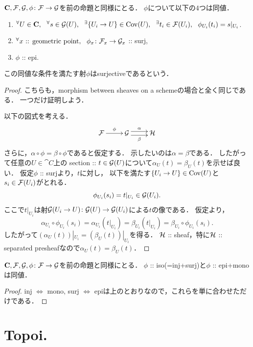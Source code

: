 \documentclass[a4paper, dvipdfmx]{jsarticle}
\begin{document}
\begin{Prop}\label{prop:surj}
    $\mathbf{C}, \mathcal{F}, \mathcal{G}, \phi \colon \mathcal{F} \to \mathcal{G}$を前の命題と同様にとる．
    $\phi$について以下の$4$つは同値．
    \begin{enumerate}
        \item ${}^{\forall} U \in \mathbf{C},~~ {}^{\forall} s \in \mathcal{G}(U),~~ {}^{\exists} \{U_i \to U\} \in \operatorname{Cov}(U),~~
                {}^{\exists} t_i \in \mathcal{F}(U_i),~~ \phi_{U_i}(t_i)=s|_{U_i}$.
        \item ${}^{\forall} x \text{ :: geometric point},~~ \phi_{x} \colon \mathcal{F}_x \to \mathcal{G}_x$ :: surj,
        \item $\phi$ :: epi.
    \end{enumerate}
    この同値な条件を満たす射$\phi$はsurjectiveであるという．
\end{Prop}
\begin{proof}
    こちらも，morphism between sheaves on a schemeの場合と全く同じである．
    一つだけ証明しよう．

    以下の図式を考える．
    \[\xymatrix{
        \shF \ar[r]^-{\phi}& \shG \ar@<1mm>[r]^-{\alpha} \ar@<-1mm>[r]_-{\beta}& \shH
    }\]
    さらに，$\alpha \circ \phi=\beta \circ \phi$であると仮定する．
    示したいのは$\alpha=\beta$である．
    したがって任意の$U \in \cat{C}$上の
    section :: $t \in \mathcal{G}(U)$について$\alpha_U(t)=\beta_U(t)$を示せば良い．
    仮定$\phi$ :: surjより，$t$に対し，
    以下を満たす$\{U_i \to U\} \in \operatorname{Cov}(U)$と$s_i \in \mathcal{F}(U_i)$がとれる．
    \[ \phi_{U_i}(s_i)=t|_{U_i} \in \mathcal{G}(U_i). \]
    ここで$t|_{U_i}$は射$\mathcal{G}(U_i \to U) \colon \mathcal{G}(U) \to \mathcal{G}(U_i)$による$t$の像である．
    仮定より，
    \[
        \alpha_{U_i} \circ \phi_{U_i}(s_i)
        =\alpha_{U_i}(t|_{U_i})=\beta_{U_i}(t|_{U_i})
        =\beta_{U_i} \circ \phi_{U_i}(s_i).
    \]
    したがって$(\alpha_U(t))|_{U_i}=(\beta_U(t))|_{U_i}$を得る．
    $\mathcal{H}$ :: sheaf，特に$\mathcal{H}$ :: separated presheafなので$\alpha_U(t)=\beta_U(t)$．
\end{proof}

\begin{Prop}
    $\mathbf{C}, \mathcal{F}, \mathcal{G}, \phi \colon \mathcal{F} \to \mathcal{G}$を前の命題と同様にとる．
    $\phi$ :: iso(=inj+surj)と$\phi$ :: epi+monoは同値．
\end{Prop}
\begin{proof}
    inj $\iff$ mono, surj $\iff$ epiは上のとおりなので，これらを単に合わせただけである．
\end{proof}

\section{Topoi.}
\end{document}
